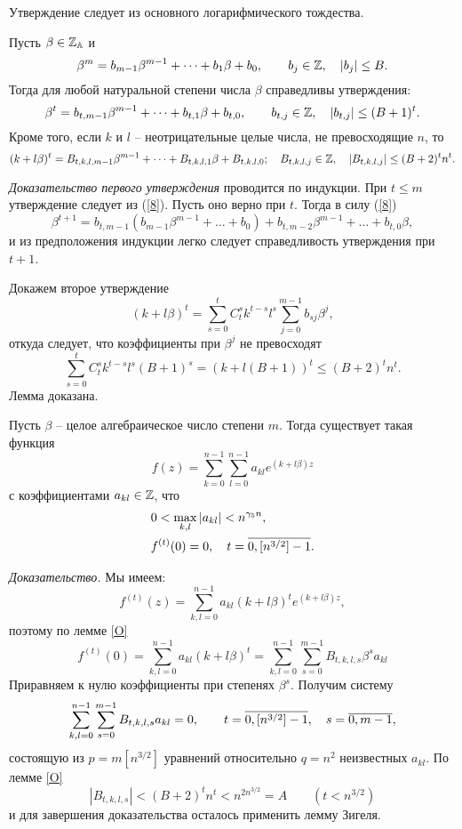 Утверждение следует из основного логарифмического
тождества.



 \begin{lemma}\label{O}  Пусть $\beta\in\Bbb Z_{\Bbb A}$ и
\begin{equation}\label{8}
\beta^m=b_{m-1}\beta^{m-1}+ \dots +b_1\beta +
b_0, \qquad b_j\in \Bbb Z, \quad |b_j| \le B.
\end{equation}
Тогда для любой натуральной степени   числа
$\beta$ справедливы утверждения:
$$
\beta^t=b_{t,m-1}\beta^{m-1}+\dots + b_{t,1}\beta +b_{t,0}, \qquad
b_{t,j}\in\Bbb Z, \quad |b_{t,j}| \le (B+1)^t.
$$
Кроме того, если $k$  и $l$   -- неотрицательные целые числа, не
превосходящие $n$,  то
$$
(k+l\beta)^t=B_{t,k,l,m-1}\beta^{m-1}+\dots +B_{t,k,l,1}\beta
+B_{t,k,l,0}; \quad B_{t,k,l,j}\in \Bbb Z, \quad |B_{t,k,l,j}|\le
(B+2)^tn^t.
$$
\end{lemma}



\emph{Доказательство первого утверждения     }
проводится по индукции. При $t\le m$ утверждение
следует из (\ref{8}). Пусть оно верно при $t$.
Тогда в силу (\ref{8})
$$
\beta^{t+1}=b_{t,m-1}(b_{m-1}\beta^{m-1}+ \dots +b_0)+
b_{t,m-2}\beta^{m-1}+ \dots +b_{t,0}\beta,
$$
и из предположения индукции легко следует справедливость
утверждения  при $t+1$.

Докажем второе утверждение
$$
(k+l\beta)^t=\sum_{s=0}^tC_t^sk^{t-s}l^s\sum_{j=0}^{m-1}b_{sj}\beta^j,
$$
откуда следует, что коэффициенты при $\beta^j$ не превосходят
$$
\sum_{s=0}^tC_t^sk^{t-s}l^s(B+1)^s=(k+l(B+1))^t \le (B+2)^tn^t.
$$
Лемма доказана.

 \begin{lemma}\label{P} Пусть $\beta$  -- целое алгебраическое число
степени $m$. Тогда существует такая функция
$$
f(z)=\sum_{k=0}^{n-1} \sum_{l=0}^{n-1} a_{kl} e^{(k+l\beta)z}
$$
с коэффициентами $a_{kl} \in \Bbb Z$, что
$$
\aligned &
0 < \max_{k,l} |a_{kl}| < n^{\gamma_5n}, \\
& f^{(t)}(0)=0, \quad t= \ol {0,[n^{3/2}]-1}.
\endaligned
$$
\end{lemma}



\emph{Доказательство.} Мы имеем:
\begin{equation}\label{9}
f^{(t)}(z)=\sum_{k,l=0}^{n-1}a_{kl}(k+l\beta)^te^{(k+l\beta)z},
\end{equation}
 поэтому по лемме \ref{O}
$$
f^{(t)}(0)=\sum_{k,l=0}^{n-1}a_{kl}(k+l\beta)^t=
\sum_{k,l=0}^{n-1}\sum_{s=0}^{m-1}B_{t,k,l,s}\beta^sa_{kl}
$$
Приравняем к нулю коэффициенты при степенях $\beta^s$. Получим
систему
$$
\sum_{k,l=0}^{n-1}\sum_{s=0}^{m-1}B_{t,k,l,s}a_{kl}=0, \qquad
t=\ol{0,[n^{3/2}]-1}, \quad s=\ol{0,m-1},
$$
состоящую из $p=m[n^{3/2}]$   уравнений
относительно $q=n^2$ неизвестных $a_{kl}$.  По
лемме \ref{O}
$$
|B_{t,k,l,s}|<(B+2)^tn^t<n^{2n^{3/2}}=A \qquad (t<n^{3/2})
$$
и для завершения доказательства осталось применить лемму Зигеля.

